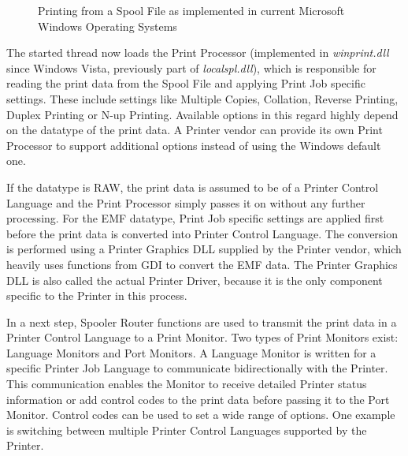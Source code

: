 \begin{figure}[h]
	
	\caption{Printing from a Spool File as implemented in current Microsoft Windows Operating Systems}
	\label{fig:WindowsPrinting}
\end{figure}

The started thread now loads the Print Processor (implemented in \emph{winprint.dll} since Windows Vista, previously part of \emph{localspl.dll}), which is responsible for reading the print data from the Spool File and applying Print Job specific settings.
These include settings like Multiple Copies, Collation, Reverse Printing, Duplex Printing or N-up Printing.
Available options in this regard highly depend on the datatype of the print data.
A Printer vendor can provide its own Print Processor to support additional options instead of using the Windows default one.

If the datatype is RAW, the print data is assumed to be of a Printer Control Language and the Print Processor simply passes it on without any further processing.
For the \gls{EMF} datatype, Print Job specific settings are applied first before the print data is converted into Printer Control Language.
The conversion is performed using a Printer Graphics \gls{DLL} supplied by the Printer vendor, which heavily uses functions from \gls{GDI} to convert the \gls{EMF} data.
The Printer Graphics \gls{DLL} is also called the actual Printer Driver, because it is the only component specific to the Printer in this process.

In a next step, Spooler Router functions are used to transmit the print data in a Printer Control Language to a Print Monitor.
Two types of Print Monitors exist: Language Monitors and Port Monitors.
A Language Monitor is written for a specific Printer Job Language to communicate bidirectionally with the Printer.
This communication enables the Monitor to receive detailed Printer status information or add control codes to the print data before passing it to the Port Monitor.
Control codes can be used to set a wide range of options.
One example is switching between multiple Printer Control Languages supported by the Printer.

